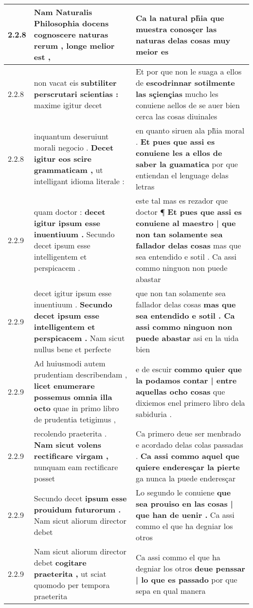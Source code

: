 \begin{tabular}{|p{1cm}|p{6.5cm}|p{6.5cm}|}
2.2.8 & Nam Naturalis Philosophia docens \textbf{ cognoscere naturas rerum , } longe melior est , & Ca la natural ph̃ia \textbf{ que muestra conosçer las naturas delas cosas } muy meior es \\\hline
2.2.8 & non vacat eis \textbf{ subtiliter perscrutari scientias : } maxime igitur decet & Et por que non le suaga a ellos de \textbf{ escodrinnar sotilmente las sçiençias } mucho les conuiene aellos de se auer bien cerca las cosas diuinales \\\hline
2.2.8 & inquantum deseruiunt morali negocio . \textbf{ Decet igitur eos scire grammaticam , } ut intelligant idioma literale : & en quanto siruen ala ph̃ia moral . \textbf{ Et pues que assi es conuiene les a ellos de saber la guamatica } por que entiendan el lenguage delas letras \\\hline
2.2.9 & quam doctor : \textbf{ decet igitur ipsum esse inuentiuum . } Secundo decet ipsum esse intelligentem et perspicacem . & este tal mas es rezador que doctor ¶ \textbf{ Et pues que assi es conuiene al maestro | que non tan solamente sea fallador delas cosas } mas que sea entendido e sotil . Ca assi commo ninguon non puede abastar \\\hline
2.2.9 & decet igitur ipsum esse inuentiuum . \textbf{ Secundo decet ipsum esse intelligentem et perspicacem . } Nam sicut nullus bene et perfecte & que non tan solamente sea fallador delas cosas \textbf{ mas que sea entendido e sotil . Ca assi commo ninguon non puede abastar } asi en la uida bien \\\hline
2.2.9 & Ad huiusmodi autem prudentiam describendam , \textbf{ licet enumerare possemus omnia illa octo } quae in primo libro de prudentia tetigimus , & e de escuir \textbf{ commo quier que la podamos contar | entre aquellas ocho cosas } que dixiemos enel primero libro dela sabiduria . \\\hline
2.2.9 & recolendo praeterita . \textbf{ Nam sicut volens rectificare virgam , } nunquam eam rectificare posset & Ca primero deue ser menbrado e acordado delas colas passadas . \textbf{ Ca assi commo aquel que quiere enderesçar la pierte } ga nunca la puede enderesçar \\\hline
2.2.9 & Secundo decet \textbf{ ipsum esse prouidum futurorum . } Nam sicut aliorum director debet & Lo segundo le conuiene \textbf{ que sea prouiso en las cosas | que han de uenir . } Ca assi commo el que ha degniar los otros \\\hline
2.2.9 & Nam sicut aliorum director debet \textbf{ cogitare praeterita , } ut sciat quomodo per tempora praeterita & Ca assi commo el que ha degniar los otros \textbf{ deue penssar | lo que es passado } por que sepa en qual manera \\\hline

\end{tabular}
